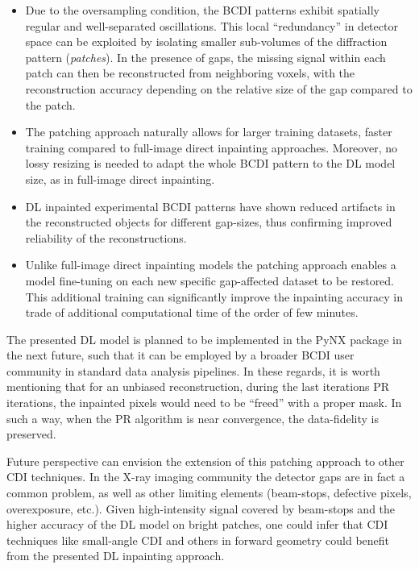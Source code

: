 \begin{itemize}
    \item Due to the oversampling condition, the BCDI patterns exhibit spatially regular and well-separated oscillations. 
    This local ``redundancy'' in detector space can be exploited by isolating smaller sub-volumes of the diffraction 
    pattern (\textit{patches}). In the presence of gaps, the missing signal within each patch can then be reconstructed 
    from neighboring voxels, with the reconstruction accuracy depending on the relative size of the gap compared to 
    the patch.

    \item The patching approach naturally allows for larger training datasets, faster training compared to full-image 
    direct inpainting approaches. Moreover, no lossy resizing is needed to adapt the whole BCDI pattern to the DL model size, as 
    in full-image direct inpainting. 

    \item DL inpainted experimental BCDI patterns have shown reduced artifacts in the reconstructed objects for different 
    gap-sizes, thus confirming improved reliability of the reconstructions. 

    \item Unlike full-image direct inpainting models the patching approach enables a model fine-tuning on each new specific 
    gap-affected dataset to be restored. This additional training can significantly improve the inpainting accuracy in trade of 
    additional computational time of the order of few minutes. 
        
\end{itemize}

The presented DL model is planned to be implemented in the PyNX package in the next future, such that it can be employed by 
a broader BCDI user community in standard data analysis pipelines. In these regards, it is worth mentioning that for 
an unbiased reconstruction, during the last iterations PR iterations, the 
inpainted pixels would need to be ``freed'' with a proper mask. In such a way, when the PR algorithm is near 
convergence, the data-fidelity is preserved. 

Future perspective can envision the extension of this patching approach to other CDI techniques. In the X-ray imaging 
community the detector gaps are in fact a common problem, as well as other limiting elements (beam-stops, defective pixels, 
overexposure, etc.). Given high-intensity signal covered by beam-stops and the higher accuracy of the DL model on 
bright patches, one could infer that CDI techniques like small-angle CDI and others in forward geometry could benefit 
from the presented DL inpainting approach.

